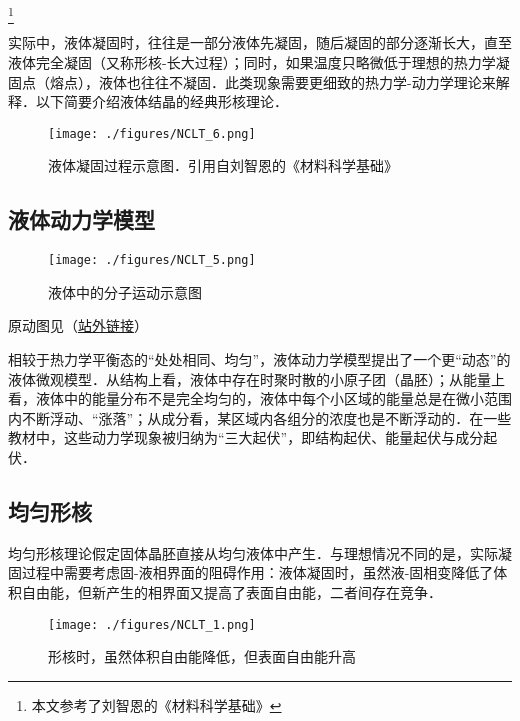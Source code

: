 \footnote{本文参考了刘智恩的《材料科学基础》}

\begin{issues}
\issueDraft
{}
\end{issues}

实际中，液体凝固时，往往是一部分液体先凝固，随后凝固的部分逐渐长大，直至液体完全凝固（又称形核-长大过程）；同时，如果温度只略微低于理想的热力学凝固点（熔点），液体也往往不凝固．此类现象需要更细致的热力学-动力学理论来解释．以下简要介绍液体结晶的经典形核理论．

\begin{figure}[ht]
\centering
\texttt{[image: ./figures/NCLT\_6.png]}
\caption{液体凝固过程示意图．引用自刘智恩的《材料科学基础》} \label{NCLT_fig6}
\end{figure}

\subsection{液体动力学模型}
\begin{figure}[ht]
\centering
\texttt{[image: ./figures/NCLT\_5.png]}
\caption{液体中的分子运动示意图} \label{NCLT_fig5}
\end{figure}

原动图见（\href{https://chem.libretexts.org/Bookshelves/General_Chemistry/Map\%3A_A_Molecular_Approach_(Tro)/11\%3A_Liquids_Solids_and_Intermolecular_Forces/11.02\%3A_Solids_Liquids_and_Gases-_A_Molecular_Comparison}{站外链接}）

相较于热力学平衡态的“处处相同、均匀”，液体动力学模型提出了一个更“动态”的液体微观模型．从结构上看，液体中存在时聚时散的小原子团（晶胚）；从能量上看，液体中的能量分布不是完全均匀的，液体中每个小区域的能量总是在微小范围内不断浮动、“涨落”；从成分看，某区域内各组分的浓度也是不断浮动的．在一些教材中，这些动力学现象被归纳为“三大起伏”，即结构起伏、能量起伏与成分起伏．

\subsection{均匀形核}
均匀形核理论假定固体晶胚直接从均匀液体中产生．与理想情况不同的是，实际凝固过程中需要考虑固-液相界面的阻碍作用：液体凝固时，虽然液-固相变降低了体积自由能，但新产生的相界面又提高了表面自由能，二者间存在竞争．
\begin{figure}[ht]
\centering
\texttt{[image: ./figures/NCLT\_1.png]}
\caption{形核时，虽然体积自由能降低，但表面自由能升高} \label{NCLT_fig1}
\end{figure}

